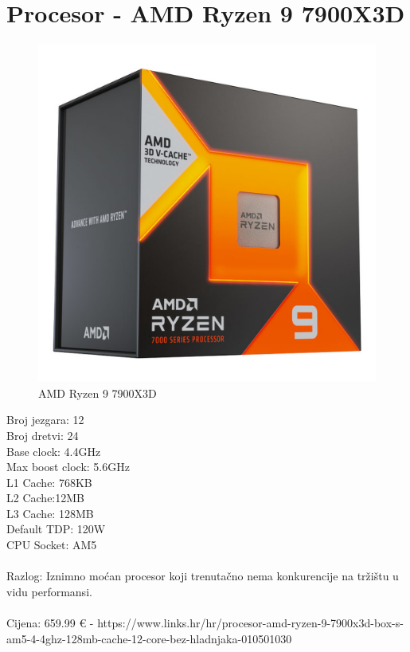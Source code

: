 \documentclass{report}
\begin{document}
\section{Procesor - AMD Ryzen 9 7900X3D}
\begin{figure}[H]
    \centering
    \includegraphics[scale=0.1]{Slike/7900x3d.jpg}
    \caption{AMD Ryzen 9 7900X3D}
    \label{fig:Procesor}
\end{figure}
Broj jezgara: 12\\Broj dretvi: 24\\Base clock: 4.4GHz\\Max boost clock: 5.6GHz\\L1 Cache: 768KB\\L2 Cache:12MB\\L3 Cache:    128MB\\Default TDP: 120W\\CPU Socket: AM5\\ \\Razlog: Iznimno moćan procesor koji trenutačno nema konkurencije na tržištu u vidu performansi.\\\\Cijena: 659.99 € - https://www.links.hr/hr/procesor-amd-ryzen-9-7900x3d-box-s-am5-4-4ghz-128mb-cache-12-core-bez-hladnjaka-010501030

\pagebreak
\end{document}
